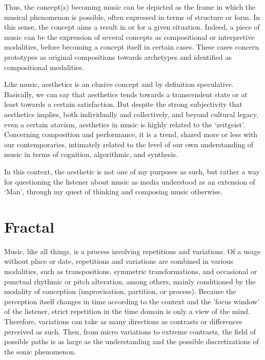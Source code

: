 \documentclass{article}
\begin{document}
Thus, the concept(s) becoming music can be depicted as the frame in which the musical phenomenon is possible, often expressed in terms of structure or form. In this sense, the concept aims a result in or for a given situation.
Indeed, a piece of music can be the expression of several concepts as compositional or interpretive modalities, before becoming a concept itself in certain cases. These cases concern prototypes as original compositions towards archetypes and identified as compositional modalities.
\smallskip

Like music, aesthetics is an elusive concept and by definition speculative. Basically, we can say that aesthetics tends towards a transcendent state or at least towards a certain satisfaction. But despite the strong subjectivity that aesthetics implies, both individually and collectively, and beyond cultural legacy, even a certain atavism, aesthetics in music is highly related to the `zeitgeist'. Concerning composition and performance, it is a trend, shared more or less with our contemporaries, intimately related to the level of our own understanding of music in terms of cognition\cite{mem}, algorithmic, and synthesis. 

In this context, the aesthetic is not one of my purposes as such, but rather a way for questioning the listener about music as media understood as an extension of `Man'\cite{um}, through my quest of thinking and composing music otherwise.

\section*{Fractal}
Music, like all things, is a process involving repetitions and variations. 
Of a usage without place or date, repetitions and variations are combined in various modalities, such as transpositions, symmetric transformations, and occasional or punctual rhythmic or pitch alteration, among others, mainly conditioned by the modality of conception (improvisation, partition, or process). 
Because the perception itself changes in time according to the context and the 'focus window' of the listener, strict repetition in the time domain is only a view of the mind. Therefore, variations can take as many directions as contrasts or differences perceived as such.
Then, from micro variations to extreme contrasts, the field of possible paths is as large as the understanding and the possible discretizations of the sonic phenomenon.
\smallskip
\end{document}
